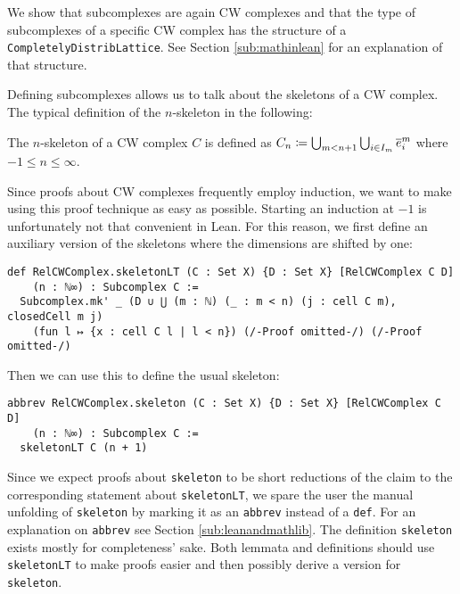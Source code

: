 We show that subcomplexes are again CW complexes and that the type of subcomplexes of a specific CW complex has the structure of a \lstinline|CompletelyDistribLattice|. 
See Section \ref{sub:mathinlean} for an explanation of that structure.  

Defining subcomplexes allows us to talk about the skeletons of a CW complex. 
The typical definition of the $n$-skeleton in the following: 

\begin{defi}
  The $n$-skeleton of a CW complex $C$ is defined as $C_n \coloneq \bigcup_{m < n + 1} \bigcup_{i \in I_m} \closedCell{m}{i}$ where $-1 \le n \le \infty$.
\end{defi}

Since proofs about CW complexes frequently employ induction, we want to make using this proof technique as easy as possible. 
Starting an induction at $-1$ is unfortunately not that convenient in Lean. 
For this reason, we first define an auxiliary version of the skeletons where the dimensions are shifted by one: 

\begin{lstlisting}[frame=single]
def RelCWComplex.skeletonLT (C : Set X) {D : Set X} [RelCWComplex C D] 
    (n : ℕ∞) : Subcomplex C :=
  Subcomplex.mk' _ (D ∪ ⋃ (m : ℕ) (_ : m < n) (j : cell C m), closedCell m j)
    (fun l ↦ {x : cell C l | l < n}) (/-Proof omitted-/) (/-Proof omitted-/)
\end{lstlisting}

Then we can use this to define the usual skeleton: 

\begin{lstlisting}[frame=single]
abbrev RelCWComplex.skeleton (C : Set X) {D : Set X} [RelCWComplex C D] 
    (n : ℕ∞) : Subcomplex C :=
  skeletonLT C (n + 1)
\end{lstlisting}

Since we expect proofs about \lstinline|skeleton| to be short reductions of the claim to the corresponding statement about \lstinline|skeletonLT|, we spare the user the manual unfolding of \lstinline|skeleton| by marking it as an \lstinline|abbrev| instead of a \lstinline|def|.
For an explanation on \lstinline|abbrev| see Section \ref{sub:leanandmathlib}.
The definition \lstinline|skeleton| exists mostly for completeness' sake. 
Both lemmata and definitions should use \lstinline|skeletonLT| to make proofs easier and then possibly derive a version for \lstinline|skeleton|.


